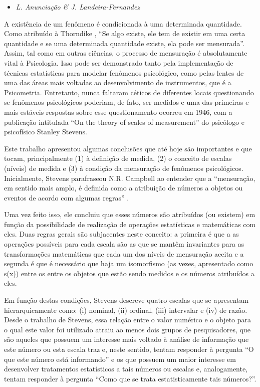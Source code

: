 \documentclass[
]{book}
\providecommand{\tightlist}{%
  \setlength{\itemsep}{0pt}\setlength{\parskip}{0pt}}
\begin{document}
\begin{itemize}
\tightlist
\item
  \emph{L. Anunciação \& J. Landeira-Fernandez}
\end{itemize}

A existência de um fenômeno é condicionada à uma determinada quantidade. Como atribuído à Thorndike \citeyearpar{Thorndike1914}, ``Se algo existe, ele tem de existir em uma certa quantidade e se uma determinada quantidade existe, ela pode ser mensurada''. Assim, tal como em outras ciências, o processo de mensuração é absolutamente vital à Psicologia. Isso pode ser demonstrado tanto pela implementação de técnicas estatísticas para modelar fenômenos psicológico, como pelas lentes de uma das áreas mais voltadas ao desenvolvimento de instrumentos, que é a Psicometria. Entretanto, nunca faltaram céticos de diferentes locais questionando se fenômenos psicológicos poderiam, de fato, ser medidos e uma das primeiras e mais estáveis respostas sobre esse questionamento ocorreu em 1946, com a publicação intitulada ``On the theory of scales of measurement'' do psicólogo e psicofísico Stanley Stevens.

Este trabalho apresentou algumas conclusões que até hoje são importantes e que tocam, principalmente (1) à definição de medida, (2) o conceito de escalas (níveis) de medida e (3) à condição da mensuração de fenômenos psicológicos. Inicialmente, Stevens parafraseou N.R. Campbell ao entender que a ``mensuração, em sentido mais amplo, é definida como a atribuição de números a objetos ou eventos de acordo com algumas regras'' \citep[p.677]{Stevens1946}.

Uma vez feito isso, ele concluiu que esses números são atribuídos (ou existem) em função da possibilidade de realização de operações estatísticas e matemáticas com eles. Duas regras gerais são subjacentes neste conceito: a primeira é que a as operações possíveis para cada escala são as que se mantêm invariantes para as transformações matemáticas que cada um dos níveis de mensuração aceita e a segunda é que é necessário que haja um isomorfismo (as vezes, apresentado como s(x)) entre os entre os objetos que estão sendo medidos e os números atribuídos a eles.

Em função destas condições, Stevens descreve quatro escalas que se apresentam hierarquicamente como: (i) nominal, (ii) ordinal, (iii) intervalar e (iv) de razão. Desde o trabalho de Stevens, essa relação entre o valor numérico e o objeto para o qual este valor foi utilizado atraiu ao menos dois grupos de pesquisadores, que são aqueles que possuem um interesse mais voltado à análise de informação que este número ou esta escala traz e, neste sentido, tentam responder à pergunta ``O que este número está informando'' e os que possuem um maior interesse em desenvolver tratamentos estatísticos a tais números ou escalas e, analogamente, tentam responder à pergunta ``Como que se trata estatisticamente tais números?''.
\end{document}
